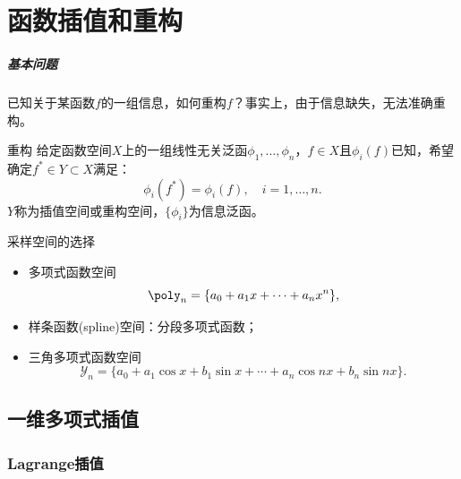 \chapter{函数插值和重构}
\label{chap:interpolation}

\paragraph{基本问题}
已知关于某函数$f$的一组信息，如何重构$f$？事实上，由于信息缺失，无法准确重构。

\begin{definition}
    {重构}{}
    给定函数空间$X$上的一组线性无关泛函$\phi_1,\ldots,\phi_n$，$f\in X$且$\phi_i(f)$已知，希望确定$f^*\in Y\subset X$满足：
    \begin{equation}
        \phi_i(f^*)=\phi_i(f),\quad i=1,\ldots,n.
    \end{equation}
    $Y$称为插值空间或重构空间，$\{\phi_i\}$为信息泛函。
\end{definition}


\begin{example}
    {采样空间的选择}{}
    \begin{itemize}
        \item 多项式函数空间
        \[
            \poly_n=\{a_0+a_1x+\cdots+a_nx^n\},
        \]
        \item 样条函数(spline)空间：分段多项式函数；
        \item 三角多项式函数空间
        \[
            \mathcal Y_n=\{a_0+a_1\cos x+b_1\sin x+\cdots+a_n\cos nx+b_n\sin nx\}.
        \]
    \end{itemize}
\end{example}

\section{一维多项式插值}
\label{sec:1-D polynomial interpolation}

\subsection{Lagrange插值}

